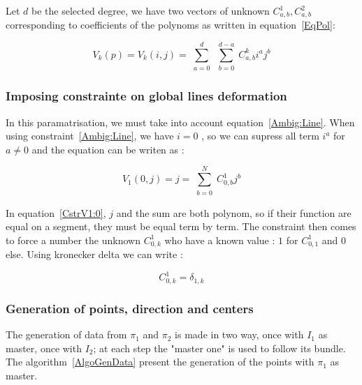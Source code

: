 \documentclass[a4paper]{article}
\begin{document}
Let $d$ be the selected degree, we have two vectors of unknown $C^1_{a,b},C^2_{a,b}$ 
corresponding to coefficients of the polynoms as written in equation~\ref{EqPol}:


\begin{equation}
   V_k(p) = V_k(i,j) =  \sum\limits_{\substack{a=0}}^d  \sum\limits_{\substack{b=0}}^{d-a}  C^k_{a,b}  i^a j^b \label{EqPol}
\end{equation}
   
\subsubsection{Imposing constrainte on global lines deformation}

In this paramatrisation, we must take into account equation~\ref{Ambig:Line}.
When using constraint~\ref{Ambig:Line}, we have  $i=0$ , so we can supress all term  $i^a$ for $a\neq 0$
and the equation can be writen as :


\begin{equation}
    V_1(0,j) =  j =   \sum\limits_{\substack{b=0}}^{N}  C^1_{0,b}  j^b  \label{CstrV1:0}
\end{equation}

In equation~\ref{CstrV1:0}, $j$ and the  sum are both polynom, so if their function are equal on a segment, they
must be equal term by term. The constraint then comes to force a number the
unknown $C^1_{0,k}$ who have a known value  : $1$ for $C^1_{0,1}$ and $0$ else.
Using kronecker delta we can write :

\begin{equation}
         C^1_{0,k} = \delta_{1,k} \label{CstrV1:1}
\end{equation}

\subsubsection{Generation of points, direction and centers}

The generation of  data from $\pi_1$ and $\pi_2$  is made
in two way, once with $I_1$ as master, once with $I_2$;
at each step the  "master one" is 
used to follow its bundle. The algorithm~\ref{AlgoGenData} present the 
generation of the points with $\pi_1$  as master.
\end{document}
